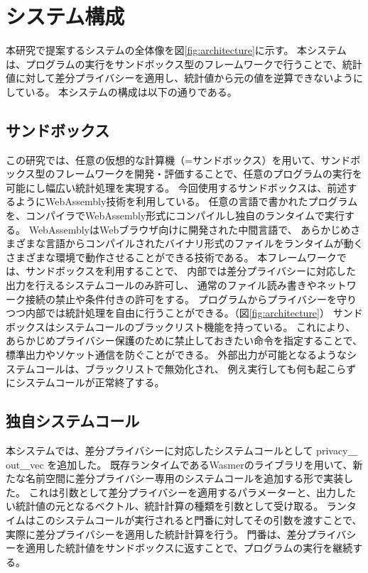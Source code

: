 \documentclass[a4paper,11pt]{jreport}
\begin{document}
\section{システム構成}

本研究で提案するシステムの全体像を図\ref{fig:architecture}に示す。
本システムは、プログラムの実行をサンドボックス型のフレームワークで行うことで、統計値に対して差分プライバシーを適用し、統計値から元の値を逆算できないようにしている。
本システムの構成は以下の通りである。

\subsection{サンドボックス}

この研究では、任意の仮想的な計算機（=サンドボックス）を用いて、サンドボックス型のフレームワークを開発・評価することで、任意のプログラムの実行を可能にし幅広い統計処理を実現する。
今回使用するサンドボックスは、前述するようにWebAssembly技術を利用している。
任意の言語で書かれたプログラムを、コンパイラでWebAssembly形式にコンパイルし独自のランタイムで実行する。
WebAssemblyはWebブラウザ向けに開発された中間言語で、
あらかじめさまざまな言語からコンパイルされたバイナリ形式のファイルをランタイムが動くさまざまな環境で動作させることができる技術である。
本フレームワークでは、サンドボックスを利用することで、
内部では差分プライバシーに対応した出力を行えるシステムコールのみ許可し、
通常のファイル読み書きやネットワーク接続の禁止や条件付きの許可をする。
プログラムからプライバシーを守りつつ内部では統計処理を自由に行うことができる。（図\ref{fig:architecture}）
サンドボックスはシステムコールのブラックリスト機能を持っている。
これにより、あらかじめプライバシー保護のために禁止しておきたい命令を指定することで、標準出力やソケット通信を防ぐことができる。
外部出力が可能となるようなシステムコールは、ブラックリストで無効化され、
例え実行しても何も起こらずにシステムコールが正常終了する。

\subsection{独自システムコール}

本システムでは、差分プライバシーに対応したシステムコールとして privacy＿out＿vec を追加した。
既存ランタイムであるWasmerのライブラリを用いて、新たな名前空間に差分プライバシー専用のシステムコールを追加する形で実装した。
これは引数として差分プライバシーを適用するパラメーターと、出力したい統計値の元となるベクトル、統計計算の種類を引数として受け取る。
ランタイムはこのシステムコールが実行されると門番に対してその引数を渡すことで、実際に差分プライバシーを適用した統計計算を行う。
門番は、差分プライバシーを適用した統計値をサンドボックスに返すことで、プログラムの実行を継続する。
\end{document}
